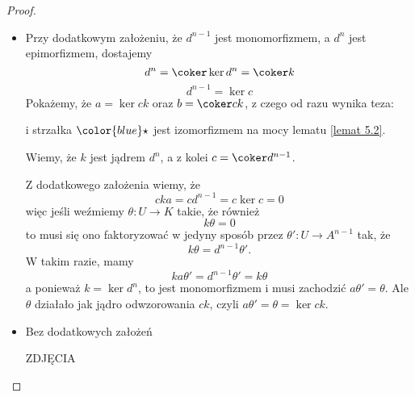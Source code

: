 \begin{proof}
  \begin{itemize}
    \item Przy dodatkowym założeniu, że $d^{n-1}$ jest monomorfizmem, a $d^n$ jest epimorfizmem, dostajemy
  $$d^n=\coker\ker d^n=\coker k$$
  $$d^{n-1}=\ker c$$
  Pokażemy, że $a=\ker ck$ oraz $b=\coker ck$, z czego od razu wynika teza:
  \begin{center}\end{center}
  i strzałka $\color{blue}\star$ jest izomorfizmem na mocy lematu \ref{lemat 5.2}.


  \begin{center}\end{center} 

  Wiemy, że $k$ jest jądrem $d^n$, a z kolei $c=\coker d^{n-1}$. 

  Z dodatkowego założenia wiemy, że
  $$cka=cd^{n-1}=c\ker c=0$$
  więc jeśli weźmiemy $\theta:U\to K$ takie, że również
  $$k\theta=0$$
  to musi się ono faktoryzować w jedyny sposób przez $\theta':U\to A^{n-1}$ tak, że
  $$k\theta= d^{n-1}\theta'.$$
  W takim razie, mamy
  $$ka\theta'=d^{n-1}\theta'=k\theta$$
  a ponieważ $k=\ker d^n$, to jest monomorfizmem i musi zachodzić $a\theta'=\theta$.
  Ale $\theta$ działało jak jądro odwzorowania $ck$, czyli $a\theta'=\theta=\ker ck$.

  \item Bez dodatkowych założeń

    {\large\color{red}ZDJĘCIA}
\end{itemize}

\end{proof}

